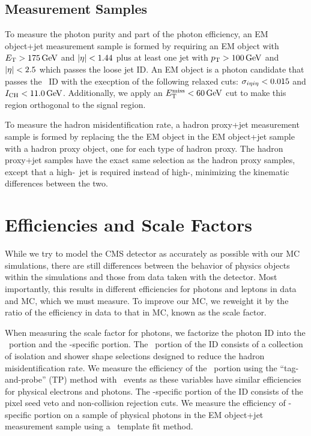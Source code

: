 \subsection{Measurement Samples}
\label{sec:measurement_samples}

To measure the photon purity and part of the photon efficiency, an EM object+jet measurement sample is formed by requiring an EM object with $E_{\mathrm{T}} > 175\,\text{Ge\hspace{-.08em}V}$ and $\lvert \eta \rvert < 1.44$ plus at least one jet with $p_{\mathrm{T}} > 100\,\text{Ge\hspace{-.08em}V}$ and $\lvert \eta \rvert < 2.5$ which passes the loose jet ID. 
An EM object is a photon candidate that passes the \egamma\ ID with the execption of the following relaxed cuts: $\sigma_{i\eta i\eta} < 0.015$ and $I_{\text{CH}} < 11.0\,\text{Ge\hspace{-.08em}V}$.
Additionally, we apply an $E_{\mathrm{T}}^{\text{miss}} < 60\,\text{Ge\hspace{-.08em}V}$ cut to make this region orthogonal to the signal region.

To measure the hadron misidentification rate, a hadron proxy+jet measurement sample is formed by replacing the the EM object in the EM object+jet sample with a hadron proxy object, one for each type of hadron proxy.
The hadron proxy+jet samples have the exact same selection as the hadron proxy samples, except that a high-\pt\ jet is required instead of high-\met, minimizing the kinematic differences between the two.

\section{Efficiencies and Scale Factors} 
\label{sec:photoneff}
While we try to model the CMS detector as accurately as possible with our MC simulations, there are still differences between the behavior of physics objects within the simulations and those from data taken with the detector.
Most importantly, this results in different efficiencies for photons and leptons in data and MC, which we must measure.
To improve our MC, we reweight it by the ratio of the efficiency in data to that in MC, known as the scale factor.

When measuring the scale factor for photons, we factorize the photon ID into the \egamma\ portion and the \Pgg-specific portion. 
The \egamma\ portion of the ID consists of a collection of isolation and shower shape selections designed to reduce the hadron misidentification rate.
We measure the efficiency of the \egamma\ portion  using the ``tag-and-probe'' (TP) method with \Zee\ events as these variables have similar efficiencies for physical electrons and photons. 
The \Pgg-specific portion of the ID consists of the pixel seed veto and non-collision rejection cuts.
We measure the efficiency of \Pgg-specific portion on a sample of physical photons in the EM object+jet measurement sample using a \sieie\ template fit method.

